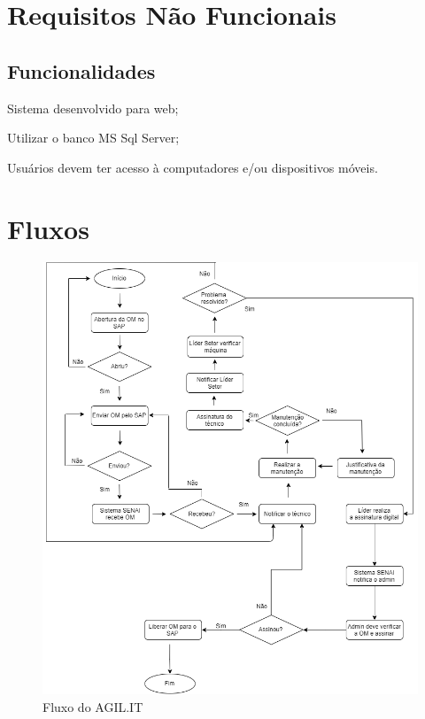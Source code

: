 \section{Requisitos Não Funcionais}


\subsection{Funcionalidades}
\begin{subalineas}
	\item {Sistema desenvolvido para web};
	\item {Utilizar o banco MS Sql Server};
	\item {Usuários devem ter acesso à computadores e/ou dispositivos móveis}.
\end{subalineas}

\section{Fluxos}

\newpage
\begin{figure}[htb]
	\caption{\label{flux_sys}Fluxo do AGIL.IT}
	\begin{center}
		\includegraphics[scale=0.55]{./Figuras/fluxo-sistema.png}
	\end{center}
\end{figure}

